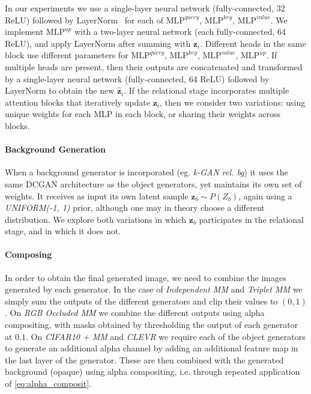 \documentclass{article}
\begin{document}
In our experiments we use a single-layer neural network (fully-connected, 32 ReLU) followed by LayerNorm~\citep{ba2016layer} for each of $\text{MLP}^{\textit{query}}$, $\text{MLP}^{\textit{key}}$, $\text{MLP}^{\textit{value}}$.
We implement $\text{MLP}^{\textit{up}}$ with a two-layer neural network (each fully-connected, 64 ReLU), and apply LayerNorm after summing with $\bm{z}_i$.
Different heads in the same block use different parameters for $\text{MLP}^{\textit{query}}$, $\text{MLP}^{\textit{key}}$, $\text{MLP}^{\textit{value}}$, $\text{MLP}^{\textit{up}}$.
If multiple heads are present, then their outputs are concatenated and transformed by a single-layer neural network (fully-connected, 64 ReLU) followed by LayerNorm to obtain the new $\bm{\hat{z}}_i$.
If the relational stage incorporates multiple attention blocks that iteratively update $\bm{z}_i$, then we consider two variations: using unique weights for each MLP in each block, or sharing their weights across blocks.

\paragraph{Background Generation}
When a background generator is incorporated (eg. \emph{k-GAN rel. bg}) it uses the same DCGAN architecture as the object generators, yet maintains its own set of weights.
It receives as input its own latent sample $\bm{z}_b \sim P(Z_b)$, again using a \emph{UNIFORM(-1, 1)} prior, although one may in theory choose a different distribution.
We explore both variations in which $\bm{z}_b$ participates in the relational stage, and in which it does not.

\paragraph{Composing} In order to obtain the final generated image, we need to combine the images generated by each generator.
In the case of \emph{Independent MM} and \emph{Triplet MM} we simply sum the outputs of the different generators and clip their values to $(0, 1)$.
On \emph{RGB Occluded MM} we combine the different outputs using alpha compositing, with masks obtained by thresholding the output of each generator at $0.1$.
On \emph{CIFAR10 + MM} and \emph{CLEVR} we require each of the object generators to generate an additional alpha channel by adding an additional feature map in the last layer of the generator.
These are then combined with the generated background (opaque) using alpha compositing, i.e. through repeated application of \eqref{eq:alpha_composit}.
\end{document}
